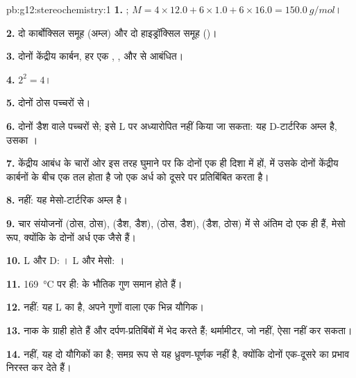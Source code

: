 \begin{solution}{pb:g12:stereochemistry:1}
\textbf{1.} ; $M = 4 \times 12.0 + 6 \times 1.0 + 6 \times 16.0
= \qty{150.0}{g/mol}$।

\textbf{2.} दो कार्बोक्सिल समूह (अम्ल) और दो हाइड्रॉक्सिल समूह
()।

\textbf{3.} दोनों केंद्रीय कार्बन, हर एक , ,
 और  से आबंधित।

\textbf{4.} $2^2 = 4$।

\textbf{5.} दोनों ठोस पच्चरों से।

\textbf{6.} दोनों  डैश वाले पच्चरों से; इसे L पर अध्यारोपित नहीं किया जा
सकता: यह D-टार्टरिक अम्ल है, उसका ।

\textbf{7.} केंद्रीय आबंध के चारों ओर इस तरह घुमाने पर कि दोनों  एक ही
दिशा में हों,  में उसके दोनों केंद्रीय कार्बनों के बीच एक तल होता है
जो एक अर्ध को दूसरे पर प्रतिबिंबित करता है।

\textbf{8.} नहीं: यह मेसो-टार्टरिक अम्ल है।

\textbf{9.} चार संयोजनों (ठोस, ठोस), (डैश, डैश),
(ठोस, डैश), (डैश, ठोस) में से अंतिम दो एक ही  हैं,
मेसो रूप, क्योंकि  के दोनों अर्ध एक जैसे हैं।

\textbf{10.} L और D: । L और मेसो: ।

\textbf{11.} \qty{169}{\celsius} पर ही:  के
भौतिक गुण समान होते हैं।

\textbf{12.} नहीं: यह L का  है, अपने गुणों वाला एक
भिन्न यौगिक।

\textbf{13.} नाक के ग्राही  होते हैं और दर्पण-प्रतिबिंबों में
भेद करते हैं; थर्मामीटर, जो  नहीं, ऐसा नहीं कर सकता।

\textbf{14.} नहीं, यह दो यौगिकों का  है; समग्र रूप से यह
ध्रुवण-घूर्णक नहीं है, क्योंकि दोनों  एक-दूसरे का प्रभाव निरस्त कर देते हैं।


\end{solution}

